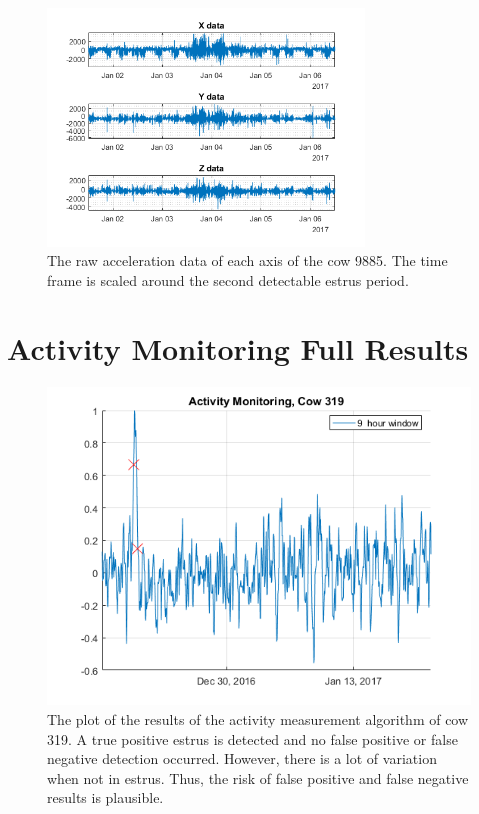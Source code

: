 \begin{figure}[htb]
\centering
\includegraphics[width = 0.75\textwidth]{figures/kiimadata_9885_2.png}
\caption{The raw acceleration data of each axis of the cow 9885. The time frame is scaled around the second detectable estrus period. }
\label{kiimadata_9885_2}
\end{figure}

\clearpage
\section{Activity Monitoring Full Results}

\begin{figure}[htb]
\centering
\includegraphics[width = 0.75 \textwidth]{figures/ActivityMonitoringCow319.png}
\caption{The plot of the results of the activity measurement algorithm of cow 319. A true positive estrus is detected and no false positive or false negative detection occurred. However, there is a lot of variation when not in estrus. Thus, the risk of false positive and false negative results is plausible.}
\label{ActivityMonitoringCow319}
\end{figure}

